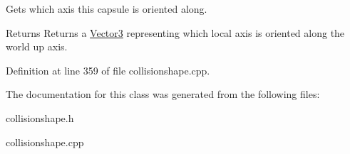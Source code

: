 Gets which axis this capsule is oriented along. 

\begin{DoxyReturn}{Returns}
Returns a \hyperlink{classphys_1_1Vector3}{Vector3} representing which local axis is oriented along the world up axis. 
\end{DoxyReturn}


Definition at line 359 of file collisionshape.cpp.



The documentation for this class was generated from the following files:\begin{DoxyCompactItemize}
\item 
collisionshape.h\item 
collisionshape.cpp\end{DoxyCompactItemize}
